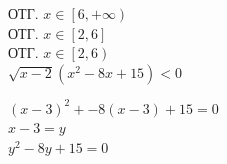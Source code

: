 \documentclass{article}
\begin{document}
ОТГ. $ x \in \left[ 6, + \infty \right) $ \\
ОТГ. $ x \in \left[ 2, 6 \right] $ \\
ОТГ. $ x \in \left[ 2 , 6 \right) $ \\ 


$ \sqrt{x-2}(x^2 - 8x + 15) < 0 $


$(x-3)^2 + -8(x-3) + 15 = 0 $ \\
$x-3 = y $ \\
$y^2 - 8y + 15 = 0 $

\end{document}
